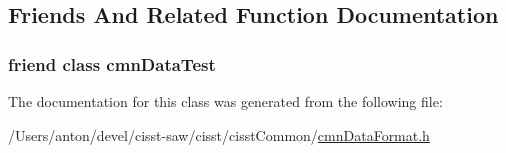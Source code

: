 \subsection{Friends And Related Function Documentation}
\hypertarget{classcmn_data_format_a27ca1c549263a07cbea497037bb4bf31}{}
\subsubsection[{cmn\+Data\+Test}]{\setlength{\rightskip}{0pt plus 5cm}friend class cmn\+Data\+Test\hspace{0.3cm}{\ttfamily [friend]}}\label{classcmn_data_format_a27ca1c549263a07cbea497037bb4bf31}


The documentation for this class was generated from the following file\+:\begin{DoxyCompactItemize}
\item 
/\+Users/anton/devel/cisst-\/saw/cisst/cisst\+Common/\hyperlink{cmn_data_format_8h}{cmn\+Data\+Format.\+h}\end{DoxyCompactItemize}

